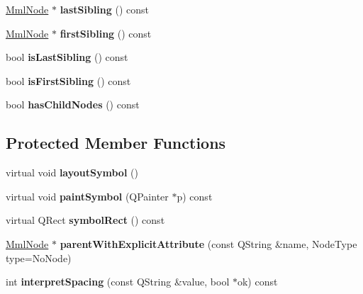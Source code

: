 \begin{DoxyCompactItemize}
\mbox{\hyperlink{class_mml_node}{Mml\+Node}} $\ast$ {\bfseries last\+Sibling} () const
\item 
\mbox{\label{class_mml_node_a104d0199658d1bb44cc13367d78b3a9a}} 
\mbox{\hyperlink{class_mml_node}{Mml\+Node}} $\ast$ {\bfseries first\+Sibling} () const
\item 
\mbox{\label{class_mml_node_a5f0f7571138dc1750edf75cf5836549e}} 
bool {\bfseries is\+Last\+Sibling} () const
\item 
\mbox{\label{class_mml_node_aa4611cd22e10135256d4e3684f48dd62}} 
bool {\bfseries is\+First\+Sibling} () const
\item 
\mbox{\label{class_mml_node_aad4ffa67eb788a6384a94af1e9202b0d}} 
bool {\bfseries has\+Child\+Nodes} () const
\end{DoxyCompactItemize}
\subsection*{Protected Member Functions}
\begin{DoxyCompactItemize}
\item 
\mbox{\label{class_mml_node_a261e90bc2b981c526d3769f57d98d935}} 
virtual void {\bfseries layout\+Symbol} ()
\item 
\mbox{\label{class_mml_node_aba11d1f35eee7373b65718233c0a5ce8}} 
virtual void {\bfseries paint\+Symbol} (Q\+Painter $\ast$p) const
\item 
\mbox{\label{class_mml_node_a5499087c98b34797634c92f6e20e4be9}} 
virtual Q\+Rect {\bfseries symbol\+Rect} () const
\item 
\mbox{\label{class_mml_node_a16f3bd97a3d5cc2393c7cf56dc3b4159}} 
\mbox{\hyperlink{class_mml_node}{Mml\+Node}} $\ast$ {\bfseries parent\+With\+Explicit\+Attribute} (const Q\+String \&name, Node\+Type type=No\+Node)
\item 
\mbox{\label{class_mml_node_aa1e136791c4db848d9b251ea6118370d}} 
int {\bfseries interpret\+Spacing} (const Q\+String \&value, bool $\ast$ok) const
\end{DoxyCompactItemize}
